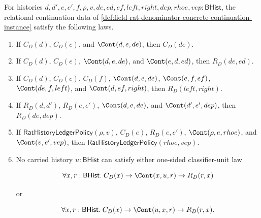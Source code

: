 \begin{theorem}
\label{thm:field-rat-denominator-concrete-continuation-instance-laws}
For histories
$d,d',e,e',f,\rho,v,de,ed,ef,left,right,dep,rhoe,vep:\mathsf{BHist}$, the
relational continuation data of
\autoref{def:field-rat-denominator-concrete-continuation-instance} satisfy the
following laws.
\begin{enumerate}
  \item If $C_D(d)$, $C_D(e)$, and $\Cont(d,e,de)$, then $C_D(de)$.
  \item If $C_D(d)$, $C_D(e)$, $\Cont(d,e,de)$, and $\Cont(e,d,ed)$, then
  $R_D(de,ed)$.
  \item If $C_D(d)$, $C_D(e)$, $C_D(f)$, $\Cont(d,e,de)$,
  $\Cont(e,f,ef)$, $\Cont(de,f,left)$, and $\Cont(d,ef,right)$, then
  $R_D(left,right)$.
  \item If $R_D(d,d')$, $R_D(e,e')$, $\Cont(d,e,de)$, and
  $\Cont(d',e',dep)$, then $R_D(de,dep)$.
  \item If $\mathsf{RatHistoryLedgerPolicy}(\rho,v)$, $C_D(e)$,
  $R_D(e,e')$, $\Cont(\rho,e,rhoe)$, and $\Cont(v,e',vep)$, then
  $\mathsf{RatHistoryLedgerPolicy}(rhoe,vep)$.
  \item No carried history $u:\mathsf{BHist}$ can satisfy either one-sided
  classifier-unit law

  $$
  \forall x,r:\mathsf{BHist}.\;
  C_D(x)\to
  \Cont(x,u,r)\to
  R_D(r,x)
  $$

  or

  $$
  \forall x,r:\mathsf{BHist}.\;
  C_D(x)\to
  \Cont(u,x,r)\to
  R_D(r,x).
  $$
\end{enumerate}
\end{theorem}
